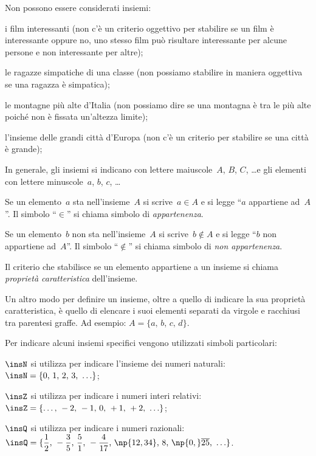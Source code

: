 Non possono essere considerati insiemi:
\begin{itemize*}
 \item i film interessanti (non c'è un criterio oggettivo per stabilire se un film è interessante oppure no, uno stesso film
può risultare interessante per alcune persone e non interessante per altre);
 \item le ragazze simpatiche di una classe (non possiamo stabilire in maniera oggettiva se una ragazza è simpatica);
 \item le montagne più alte d'Italia (non possiamo dire se una montagna è tra le più alte poiché non è fissata
un'altezza limite);
 \item l'insieme delle grandi città d'Europa (non c'è un criterio per
stabilire se una città è grande);
\end{itemize*}

\ovalbox{\risolvi \ref{ese:5.1}}\vspazio


In generale, gli insiemi si indicano con lettere maiuscole~$A$, $B$, $C$, \ldots e
gli elementi con lettere minuscole~$a$, $b$, $c$, \ldots

Se un elemento~$a$ sta nell'insieme~$A$ si scrive~$a\in A$ e si legge ``$a$ appartiene ad~$A$''.
Il simbolo ``$\in$'' si chiama simbolo di \textit{appartenenza}.

Se un elemento~$b$ non sta nell'insieme~$A$ si scrive~$b\notin A$ e
si legge ``$b$ non appartiene ad~$A$''. Il simbolo ``$\notin$''
si chiama simbolo di \textit{non appartenenza}.

Il criterio che stabilisce se un elemento appartiene a un insieme si chiama \textit{proprietà caratteristica} dell'insieme.

Un altro modo per definire un insieme, oltre a quello di indicare la sua proprietà caratteristica, è quello di elencare i suoi elementi separati da virgole e racchiusi tra parentesi graffe. Ad esempio: $A=\{a\text{, }b\text{, }c\text{, }d\}$.

Per indicare alcuni insiemi specifici vengono utilizzati simboli particolari:
\begin{itemize*}
 \item $\insN$ si utilizza per indicare l'insieme dei numeri naturali:~$\insN=\{0\text{, }1\text{, }2\text{, }3\text{, }\ldots\}$;
 \item $\insZ$ si utilizza per indicare i numeri interi relativi:~$\insZ=\{\ldots\text{, }-2\text{, }-1\text{, }0\text{, }+1\text{, }+2\text{, }\ldots\}$;
 \item $\insQ$ si utilizza per indicare i numeri razionali:~$\insQ=\{\dfrac{1}{2}\text{, }-\dfrac{3}{5}\text{, }\dfrac{5}{1}\text{, }-\dfrac{4}{17}\text{, }\np{12,34}\text{, }8\text{, }\np{0,}\overline{25}\text{, }\ldots\}$.
 \end{itemize*}


